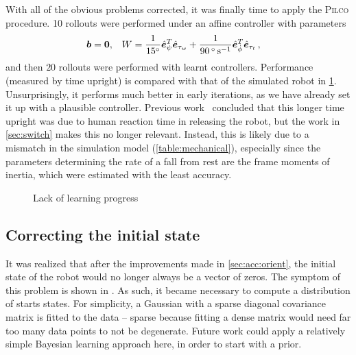 \documentclass[main.tex]{subfiles}
\begin{document}
	With all of the obvious problems corrected, it was finally time to apply the \textsc{Pilco} procedure.
	10 rollouts were performed under an affine controller with parameters
	\begin{align}
		\bm{b} &= \bm{0}, &
		W &=
			\frac{1}{\SI{15}{\degree}}
			\hat{\bm{e}}_{\psi}^T\hat{\bm{e}}_{\tau_w}
			+ \frac{1}{\SI{90}{\degree\per\second}}
			\hat{\bm{e}}_{\dot\phi}^T\hat{\bm{e}}_{\tau_t}\,,
	\end{align}
	and then $20$ rollouts were performed with learnt controllers.
	Performance (measured by time upright) is compared with that of the simulated robot in \cref{fig:learning-compare}.
	Unsurprisingly, it performs much better in early iterations, as we have already set it up with a plausible controller.
	Previous work~\cite{aleksi} concluded that this longer time upright was due to human reaction time in releasing the robot, but the work in \cref{sec:switch} makes this no longer relevant.
	Instead, this is likely due to a mismatch in the simulation model (\cref{table:mechanical}), especially since the parameters determining the rate of a fall from rest are the frame moments of inertia, which were estimated with the least accuracy.
	\begin{figure}
		
		\caption{Lack of learning progress}
		\label{fig:learning-compare}
	\end{figure}

	\subsection{Correcting the initial state}
	It was realized that after the improvements made in \cref{sec:acc:orient}, the initial state of the robot would no longer always be a vector of zeros. The symptom of this problem is shown in \todo{}.
	As such, it became necessary to compute a distribution of starts states.
	For simplicity, a Gaussian with a sparse diagonal covariance matrix is fitted to the data -- sparse because fitting a dense matrix would need far too many data points to not be degenerate. Future work could apply a relatively simple Bayesian learning approach here, in order to start with a prior.

\bib
\end{document}

